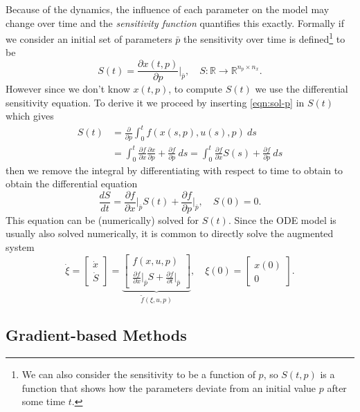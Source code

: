 \documentclass[a4paper]{article}
\theoremstyle{plain}
\theoremstyle{definition}
\theoremstyle{remark}
\begin{document}
Because of the dynamics, the influence of each parameter on the model may
change over time and the \emph{sensitivity function} quantifies this exactly.
Formally if we consider an initial set of parameters $\bar{p}$ the sensitivity
over time is defined\footnote{We can also consider the sensitivity to be a
function of $p$, so $S(t, p)$ is a function that shows how the parameters
deviate from an initial value $p$ after some time $t$.} to be
\[
  S(t) = \frac{\partial x(t, p)}{\partial p} \bigg|_{\bar{p}},
  \quad S: \mathbb{R} \to \mathbb{R}^{n_p \times n_x}.
\]
However since we don't know $x(t, p)$, to compute $S(t)$ we use the
differential sensitivity equation. To derive it we proceed by inserting
\eqref{eqn:sol-p} in $S(t)$ which gives
\begin{align*}
  S(t) &= \frac{\partial}{\partial p} \int_0^t f(x(s, p), u(s), p) ~ ds \\
  &= \int_0^t \frac{\partial f}{\partial x} \frac{\partial x}{\partial p}
   + \frac{\partial f}{\partial p} ~ ds
    = \int_0^t \frac{\partial f}{\partial x} S(s)
      + \frac{\partial f}{\partial p} ~ ds
\end{align*}
then we remove the integral by differentiating with respect to time to obtain
to obtain the differential equation
\[
  \frac{dS}{dt} = \frac{\partial f}{\partial x} \bigg|_{\bar{p}} S(t)
    + \frac{\partial f}{\partial p} \bigg|_{\bar{p}}, \quad S(0) = 0.
\]
This equation can be (numerically) solved for $S(t)$. Since the ODE model is
usually also solved numerically, it is common to directly solve the augmented
system
\[
  \dot{\xi} =
  \begin{bmatrix} \dot{x} \\ \dot{S} \end{bmatrix} =
  \underbrace{\begin{bmatrix}
    f(x, u, p) \\
    \frac{\partial f}{\partial x} \big|_{\bar{p}} S
    + \frac{\partial f}{\partial t} \big|_{\bar{p}}
  \end{bmatrix}}_{\tilde{f}(\xi, u, p)},
  \quad \xi(0) = \begin{bmatrix}
    x(0) \\ 0
  \end{bmatrix}.
\]

\subsection{Gradient-based Methods}
\end{document}
